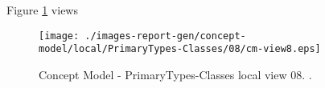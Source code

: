 Figure \ref{fig:lu.uni.lassy.excalibur.examples.icrash-CM-view-local-PrimaryTypes-Classes-08} views



\begin{figure}[htbp] 
\label{fig:lu.uni.lassy.excalibur.examples.icrash-CM}
\begin{center}
\texttt{[image: ./images-report-gen/concept-model/local/PrimaryTypes-Classes/08/cm-view8.eps]}
\end{center}
\caption[Concept Model - PrimaryTypes-Classes local view 08 - ]{Concept Model - PrimaryTypes-Classes local view 08. .}
\label{fig:lu.uni.lassy.excalibur.examples.icrash-CM-view-local-PrimaryTypes-Classes-08}
\end{figure}
\vspace{0.5cm} 
